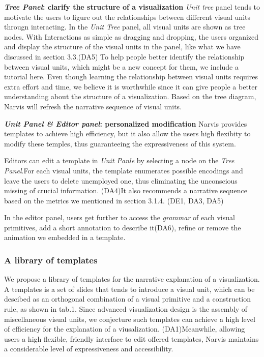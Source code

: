 \textbf{\textit{Tree Panel}: clarify the structure of a visualization}
\textit{Unit tree} panel tends to motivate the users to figure out the relationships between different visual units througn interacting.  
In the \textit{Unit Tree} panel, all visual units are shown as tree nodes.
With Interactions as simple as dragging and dropping, the users organized and display the structure of the visual units in the panel, like what we have discussed in section 3.3.(DA5) To help people better identify the relationship between visual units, which might be a new concept for them, we include a tutorial here. Even though learning the relationship between visual units requires extra effort and time, we believe it is worthwhile since it can give people a better understanding about the structure of a visualization. Based on the tree diagram, Narvis will refresh the narrative sequence of visual units. 

\textbf{\textit{ Unit Panel \& Editor panel}: personalized modification}
Narvis provides templates to achieve high efficiency, but it also allow the users high flexibity to modify these temples, thus guaranteeing the expressiveness of this system. 
 
Editors can edit a template in \textit{Unit Panle} by selecting a node on the \textit{Tree Panel}.For each visual units, the template enumerates possible encodings and leave the users to delete unemployed one, thus eliminating the unconscious missing of crucial information. (DA4)It also recommends a narrative sequence based on the metrics we mentioned in section 3.1.4. (DE1, DA3, DA5) 
 
In the editor panel, users get further to access the \textit{grammar} of each visual primitives, add a short annotation to describe it(DA6), refine or remove the animation we embedded in a template. 

\subsubsection{A library of templates}
We propose a library of templates for the narrative explanation of a visualization. A templates is a set of slides that tends to introduce a visual unit, which can be descibed as an orthogonal combination of a visual primitive and a construction rule, as shown in tab.1. Since advanced visualization design is the assembly of miscellaneous visual units, we conjecture such templates can achieve a high level of efficiency for the explanation of a viusalization. (DA1)Meanwhile, allowing users a high flexible, friendly interface to edit offered templates, Narvis maintains a considerable level of expressiveness and accessibility. 

